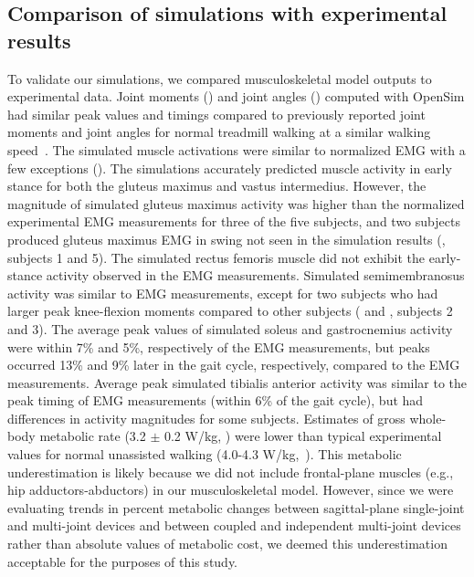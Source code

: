 \documentclass[10pt,letterpaper]{article}
\begin{document}
\subsection*{Comparison of simulations with experimental results}
To validate our simulations, we compared musculoskeletal model outputs to experimental data. Joint moments () and joint angles () computed with OpenSim had similar peak values and timings compared to previously reported joint moments and joint angles for normal treadmill walking at a similar walking speed~\cite{Silder:2013}. The simulated muscle activations were similar to normalized EMG with a few exceptions (). The simulations accurately predicted muscle activity in early stance for both the gluteus maximus and vastus intermedius. However, the magnitude of simulated gluteus maximus activity was higher than the normalized experimental EMG measurements for three of the five subjects, and two subjects produced gluteus maximus EMG in swing not seen in the simulation results (, subjects 1 and 5). The simulated rectus femoris muscle did not exhibit the early-stance activity observed in the EMG measurements. Simulated semimembranosus activity was similar to EMG measurements, except for two subjects who had larger peak knee-flexion moments compared to other subjects ( and , subjects 2 and 3). The average peak values of simulated soleus and gastrocnemius activity were within 7\% and 5\%, respectively of the EMG measurements, but peaks occurred 13\% and 9\% later in the gait cycle, respectively, compared to the EMG measurements. Average peak simulated tibialis anterior activity was similar to the peak timing of EMG measurements (within 6\% of the gait cycle), but had differences in activity magnitudes for some subjects. Estimates of gross whole-body metabolic rate (3.2 $\pm$ 0.2 W/kg, ) were lower than typical experimental values for normal unassisted walking (4.0-4.3 W/kg,~\cite{Waters:1999}). This metabolic underestimation is likely because we did not include frontal-plane muscles (e.g., hip adductors-abductors) in our musculoskeletal model. However, since we were evaluating trends in percent metabolic changes between sagittal-plane single-joint and multi-joint devices and between coupled and independent multi-joint devices rather than absolute values of metabolic cost, we deemed this underestimation acceptable for the purposes of this study.
\end{document}
